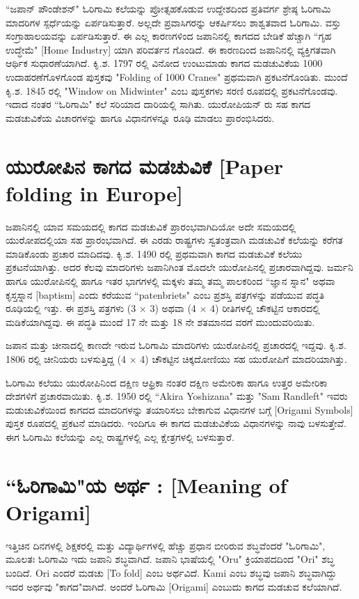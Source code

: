 ``ಜಪಾನ್ ಪೌಂಡೇಶನ್" ಓರಿಗಾಮಿ ಕಲೆಯನ್ನು ಪ್ರೋತ್ಸಹಕೊಡುವ ಉದ್ದೇಶದಿಂದ ಪ್ರತಿವರ್ಗ ಶ್ರೇಷ್ಠ ಓರಿಗಾಮಿ ಮಾದರಿಗಳ ಸ್ಪರ್ಧೆಯನ್ನು ಏರ್ಪಡಿಸುತ್ತಾರೆ. ಅಲ್ಲದೇ ಪ್ರವಾಸಿಗರನ್ನು ಆಕರ್ಷಿಸಲು ಶಾಶ್ವತವಾದ ಓರಿಗಾಮಿ. ವಸ್ತು ಸಂಗ್ರಾಹಾಲಯವನ್ನು ಏರ್ಪಡಿಸುತ್ತಾರೆ. ಈ ಎಲ್ಲ ಕಾರಣಗಳಿಂದ ಜಪಾನಿನಲ್ಲಿ ಕಾಗದದ ಬೇಡಿಕೆ ಹೆಚ್ಚಾಗಿ ``ಗೃಹ ಉದ್ಧೇಮೆ" [Home Industry] ಯಾಗಿ ಪರಿವರ್ತನ ಗೊಂಡಿದೆ. ಈ ಕಾರಣದಿಂದ ಜಪಾನಿನಲ್ಲಿ ವ್ಯಕ್ತಿಗತವಾಗಿ ಆರ್ಥಿಕ ಸುಧಾರಣೆಯಾಗಿದೆ. ಕಿೃ.ಶ. 1797 ರಲ್ಲಿ ವಿನೋದ ಉಂಟುಮಾಡು ಕಾಗದ ಮಡಚುವಿಕೆಯ 1000 ಉದಾಹರಣೆಗೊಳಗೊಂಡ ಪುಸ್ತಕವು "Folding of 1000 Cranes"  ಪ್ರಥಮವಾಗಿ ಪ್ರಕಟನೆಗೊಂಡಿತು. ಮುಂದೆ ಕಿೃ.ಶ. 1845 ರಲ್ಲಿ "Window on Midwinter" ಎಂಬ ಪುಸ್ತಕಗಳು ಸರಣಿ ರೂಪದಲ್ಲಿ ಪ್ರಕಟನೆಗೊಂಡವು. ಇದಾದ ನಂತರ ``ಓರಿಗಾಮಿ" ಕಲೆ ಸರಿಯಾದ ದಾರಿಯಲ್ಲಿ ಸಾಗಿತು. ಯುರೋಪಿಯನ್ ರು ಸಹ ಕಾಗದ ಮಡಚುವಿಕೆಯ ವಿಚಾರಗಳನ್ನು ಹಾಗೂ ವಿಧಾನಗಳನ್ನೂ ರೂಢಿ ಮಾಡಲು ಪ್ರಾರಂಭಿಸಿದರು. 

\section*{ಯುರೋಪಿನ ಕಾಗದ ಮಡಚುವಿಕೆ [Paper folding in Europe]}
ಜಪಾನಿನಲ್ಲಿ ಯಾವ ಸಮಯದಲ್ಲಿ ಕಾಗದ ಮಡಚುವಿಕೆ ಪ್ರಾರಂಭವಾಗಿದಿಯೋ ಅದೇ ಸಮಯದಲ್ಲಿ ಯುರೋಪದಲ್ಲಿಯಾ ಸಹ ಪ್ರಾರಂಭವಾಗಿದೆ. ಈ ಎರಡು ರಾಷ್ಟ್ರಗಳು ಸ್ವತಂತ್ರವಾಗಿ ಮಡಚುವಿಕೆ ಕಲೆಯನ್ನು ಕರೆಗತ ಮಾಡಿಕೊಂಡು ಪ್ರಚಾರ ಮಾದಿದವು. ಕಿೃ.ಶ. 1490 ರಲ್ಲಿ ಪ್ರಥಮವಾಗಿ ಕಾಗದ ಮಡಚುವಿಕೆ ಕಲೆಯು ಪ್ರಕಟನೆಯಾಗಿತ್ತು. ಅದರ ಕೆಲವು ಮಾದರಿಗಳು ಜಪಾನಿಗಿಂತ ಮೊದಲೇ ಯುರೋಪಿನಲ್ಲಿ ಪ್ರಚಾರವಾಗಿದ್ದವು. ಜರ್ಮನಿ ಹಾಗೂ ಯುರೋಪಿನಲ್ಲಿ ಹಾಗೂ ಇತರ ಭಾಗಗಳಲ್ಲಿ ಮಕ್ಕಳು ತಮ್ಮ ತಮ್ಮ ಪಾಲಕರಿಂದ ``ಜ್ಞಾನ ಸ್ನಾನ" ಅಥವಾ ಕೃಸ್ತಸ್ನಾನ [baptism]  ಎಂದು ಕರೆಯುವ ``patenbriets" ಎಂಬ ಪ್ರಶಸ್ತಿ ಪತ್ರಗಳನ್ನು ಪಡೆಯುವ ಪದ್ಧತಿ ರೂಢಿಯಲ್ಲಿ ಇತ್ತು. ಈ ಪ್ರಶಸ್ತಿ ಪತ್ರಗಳು (3 $\times$ 3) ಅಥವಾ  (4 $\times$ 4)  ರೀತಿಗಳಲ್ಲಿ ಚೌಕಟ್ಟಿನ ಆಕಾರದಲ್ಲಿ ಮಡಿಕೆಯಾಗಿದ್ದವು. ಈ ಪದ್ಧತಿ ಮುಂದೆ 17 ನೇ ಮತ್ತು 18 ನೇ ಶತಮಾನದ ವರಗೆ ಮುಂದುವರಿಯಿತು. 

ಜಪಾನ ಮತ್ತು ಚೀನಾದಲ್ಲಿ ಕಾಣದೇ ಇರುವ ಓರಿಗಾಮಿ ಮಾದರಿಗಳು ಯುರೋಪಿನಲ್ಲಿ ಪ್ರಚಾರದಲ್ಲಿ ಇದ್ದವು. ಕಿೃ.ಶ. 1806 ರಲ್ಲಿ ಚೀನಿಯರು ಬಳಸುತ್ತಿದ್ದ (4 $\times$ 4) ಚೌಕಟ್ಟಿನ ಚಿಕ್ಕದೋಣಿಯು ಸಹ ಯುರೋಪಿಗೆ ಮಾದರಿಯಾಗಿತ್ತು.

ಓರಿಗಾಮಿ ಕಲೆಯು ಯುರೋಪಿನಿಂದ ದಕ್ಷಿಣ ಆಫ್ರಿಕಾ ನಂತರ ದಕ್ಷಿಣ ಅಮೇರಿಕಾ ಹಾಗೂ ಉತ್ತರ ಅಮೇರಿಕಾ ದೇಶಗಳಿಗೆ ಪ್ರಚಾರವಾಯಿತು. ಕಿೃ.ಶ. 1950 ರಲ್ಲಿ  ``Akira Yoshizana" ಮತ್ತು "Sam Randleft"  ಇವರು ಮಡುಚುವಿಕೆಯಿಂದ ಕಾಗದದ ಮಾದರಿಗಳನ್ನು ತಯಾರಿಸಲು ಬೇಕಾಗುವ ವಿಧಾನಗಳ ಬಗ್ಗೆ  [Origami Symbols] ಪುಸ್ತಕ ರೂಪದಲ್ಲಿ ಪ್ರಕಟನೆ ಮಾಡಿದರು. ಇಂದಿಗೂ ಈ ಕಾಗದ ಮಡಚುವಿಕೆಯ ವಿಧಾನಗಳನ್ನು ನಾವು ಬಳಸುತ್ತೇವೆ. ಈಗ ಓರಿಗಾಮಿ ಕಲೆಯನ್ನು ಎಲ್ಲ ರಾಷ್ಟ್ರಗಳಲ್ಲಿ ಎಲ್ಲ ಕ್ಷೇತ್ರಗಳಲ್ಲಿ ಬಳಸುತ್ತಾರೆ. 


\section*{``ಓರಿಗಾಮಿ"ಯ  ಅರ್ಥ : [Meaning of Origami]}
ಇತ್ತಿಚಿನ ದಿನಗಳಲ್ಲಿ ಶಿಕ್ಷಕರಲ್ಲಿ ಮತ್ತು ವಿದ್ಯಾರ್ಥಿಗಳಲ್ಲಿ ಹೆಚ್ಚು ಪ್ರಧಾನ ಬೀರಿರುವ ಶಬ್ಧವೆಂದರೆ "ಓರಿಗಾಮಿ", ಮೂಲತಃ ಓರಿಗಾಮಿ ಇದು ಜಪಾನಿ ಶಬ್ಧವಾಗಿದೆ. ಜಪಾನಿ ಭಾಷೆಯಲ್ಲಿ "Oru" ಕ್ರಿಯಾಪದದಿಂದ "Ori" ಶಬ್ಧ ಬಂದಿದೆ. Ori ಎಂದರೆ ಮಡಚು  [To fold] ಎಂಬ ಅರ್ಥವಿದೆ.  Kami ಎಂಬ ಶಬ್ಧವು ಜಪಾನಿ ಶಬ್ಧವಾಗಿದ್ದು ಇದರ ಅರ್ಥವು "ಕಾಗದ"ವಾಗಿದೆ. ಅಂದರೆ ಓರಿಗಾಮಿ [Origami] ಎಂಬುದು ಕಾಗದ ಮಡಚುವ ಕಲೆಯಾಗಿದೆ. 


